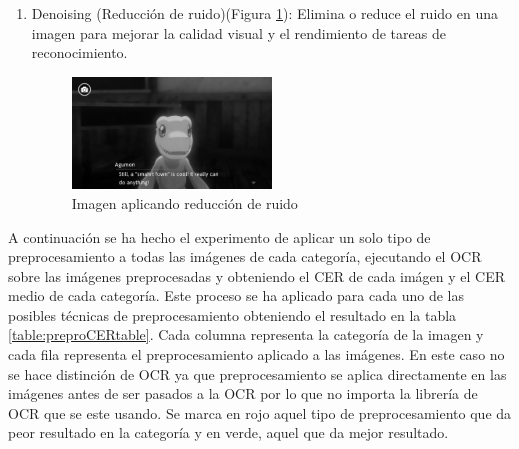 \begin{enumerate}
	\item Denoising (Reducción de ruido)(Figura \ref{fig:Denoising}): 
	Elimina o reduce el ruido en una imagen para mejorar la calidad visual y el rendimiento de tareas de reconocimiento.
	\begin{figure}[H]
		\centering
		\includegraphics[width = 0.5\textwidth]{Imagenes/Preprocesado/11.png}
		\caption{Imagen aplicando reducción de ruido}
		\label{fig:Denoising}
	\end{figure}
	
\end{enumerate}
A continuación se ha hecho el experimento de aplicar un solo tipo de preprocesamiento a todas las imágenes de cada categoría, ejecutando el OCR sobre las imágenes preprocesadas y obteniendo el CER de cada imágen y el CER medio de cada categoría. Este proceso se ha aplicado para cada uno de las posibles técnicas de preprocesamiento obteniendo el resultado en la tabla \ref{table:preproCERtable}. Cada columna representa la categoría de la imagen y cada fila representa el preprocesamiento aplicado a las imágenes. En este caso no se hace distinción de OCR ya que preprocesamiento se aplica directamente en las imágenes antes de ser pasados a la OCR por lo que no importa la librería de OCR que se este usando.
Se marca en rojo aquel tipo de preprocesamiento que da peor resultado en la categoría y en verde, aquel que da mejor resultado.

